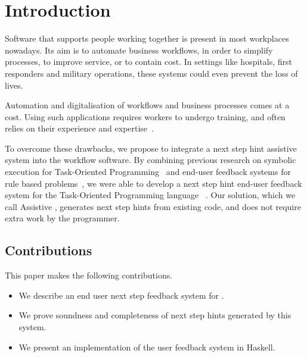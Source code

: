 
\section{Introduction}
\label{sec:intro}

Software that supports people working together is present in most workplaces nowadays.
Its aim is to automate business workflows, in order to simplify processes, to improve service, or to contain cost.
In settings like hospitals, first responders and military operations, these systems could even prevent the loss of lives.


Automation and digitalisation of workflows and business processes comes at a cost.
Using such applications requires workers to undergo training, and often relies on their experience and expertise~\cite{}.

To overcome these drawbacks, we propose to integrate a next step hint assistive system into the workflow software.
By combining previous research on symbolic execution for Task-Oriented Programming~\cite{Naus2019} and end-user feedback systems for rule based problems~\cite{DBLP:conf/sfp/NausJ16},
we were able to develop a next step hint end-user feedback system for the Task-Oriented Programming language \TOPHAT~\cite{Steenvoorden2019}.
Our solution, which we call Assistive \TOPHAT, generates next step hints from existing code, and does not require extra work by the programmer.



\subsection{Contributions}

This paper makes the following contributions.

\begin{itemize}
  \item We describe an end user next step feedback system for \TOPHAT.
  \item We prove soundness and completeness of next step hints generated by this system.
  \item We present an implementation of the user feedback system in Haskell.
\end{itemize}


